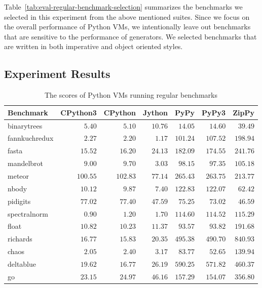 Table~\ref{tab:eval-regular-benchmark-selection} summarizes the benchmarks we selected in this experiment from the above mentioned suites.
Since we focus on the overall performance of Python VMs, we intentionally leave out benchmarks that are sensitive to the performance of generators.
We selected benchmarks that are written in both imperative and object oriented styles.

\subsection{Experiment Results}

\begin{table}
  \small
  \begin{center}
  \begin{tabular}{ l r r r r r r }
  \toprule
  Benchmark     & CPython3  & CPython  & Jython  & PyPy     & PyPy3    & ZipPy \\
  \midrule
  \textsf{binarytrees}   & $5.40$    & $5.10$   & $10.76$ & $14.05$  & $14.60$  & $39.49$ \\
  \textsf{fannkuchredux} & $2.27$    & $2.20$   & $1.17$  & $101.24$ & $107.52$ & $198.94$ \\
  \textsf{fasta}         & $15.52$   & $16.20$  & $24.13$ & $182.09$ & $174.55$ & $241.76$ \\
  \textsf{mandelbrot}    & $9.00$    & $9.70$   & $3.03$  & $98.15$  & $97.35$  & $105.18$ \\
  \textsf{meteor}        & $100.55$  & $102.83$ & $77.14$ & $265.43$ & $263.75$ & $213.77$ \\
  \textsf{nbody}         & $10.12$   & $9.87$   & $7.40$  & $122.83$ & $122.07$ & $62.42$ \\
  \textsf{pidigits}      & $77.02$   & $77.40$  & $47.59$ & $75.25$  & $73.02$  & $46.59$ \\
  \textsf{spectralnorm}  & $0.90$    & $1.20$   & $1.70$  & $114.60$ & $114.52$ & $115.29$ \\
  \textsf{float}         & $10.82$   & $10.23$  & $11.37$ & $93.57$  & $93.82$  & $191.68$ \\
  \textsf{richards}      & $16.77$   & $15.83$  & $20.35$ & $495.38$ & $490.70$ & $840.93$ \\
  \textsf{chaos}         & $2.05$    & $2.40$   & $3.17$  & $83.77$  & $52.65$  & $139.94$ \\
  \textsf{deltablue}     & $19.62$   & $16.77$  & $26.19$ & $590.25$ & $571.82$ & $460.37$ \\
  \textsf{go}            & $23.15$   & $24.97$  & $46.16$ & $157.29$ & $154.07$ & $356.80$ \\
  \bottomrule
  \end{tabular}
  \caption{The scores of Python VMs running regular benchmarks}
  \label{tab:eval-regular-benchmarks-scores}
  \end{center}
\end{table}

